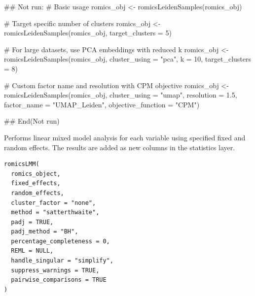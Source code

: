 \documentclass[a4paper]{book}
\begin{document}
\begin{Examples}
\begin{ExampleCode}
## Not run: 
# Basic usage
romics_obj <- romicsLeidenSamples(romics_obj)

# Target specific number of clusters
romics_obj <- romicsLeidenSamples(romics_obj, target_clusters = 5)

# For large datasets, use PCA embeddings with reduced k
romics_obj <- romicsLeidenSamples(romics_obj,
                                  cluster_using = "pca",
                                  k = 10,
                                  target_clusters = 8)

# Custom factor name and resolution with CPM objective
romics_obj <- romicsLeidenSamples(romics_obj,
                                  cluster_using = "umap",
                                  resolution = 1.5,
                                  factor_name = "UMAP_Leiden",
                                  objective_function = "CPM")

## End(Not run)
\end{ExampleCode}
\end{Examples}
%
\begin{Description}
Performs linear mixed model analysis for each variable using specified fixed and random effects. The results are added as new columns in the statistics layer.
\end{Description}
%
\begin{Usage}
\begin{verbatim}
romicsLMM(
  romics_object,
  fixed_effects,
  random_effects,
  cluster_factor = "none",
  method = "satterthwaite",
  padj = TRUE,
  padj_method = "BH",
  percentage_completeness = 0,
  REML = NULL,
  handle_singular = "simplify",
  suppress_warnings = TRUE,
  pairwise_comparisons = TRUE
)
\end{verbatim}
\end{Usage}
%
\end{document}
